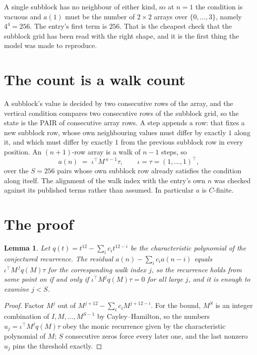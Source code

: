 \documentclass[11pt,a4paper]{article}
\theoremstyle{plain}
\newtheorem{lemma}[theorem]{Lemma}
\theoremstyle{definition}
\begin{document}
A single subblock has no neighbour of either kind, so at $n=1$ the condition is vacuous and
$a(1)$ must be the number of $2\times2$ arrays over $\{0,\dots,3\}$, namely
$4^{4}=256$. The entry's first term is $256$.
That is the cheapest check that the subblock grid has been read with the right shape, and it
is the first thing the model was made to reproduce.

\section{The count is a walk count}

A subblock's value is decided by two consecutive rows of the array, and the
vertical condition compares two consecutive rows of the subblock grid, so the state is the
PAIR of consecutive array rows. A step appends a row: that fixes a new subblock row, whose own
neighbouring values must differ by exactly $1$ along it, and which must differ by exactly
$1$ from the previous subblock row in every position. An $(n+1)$-row array is a walk of
$n-1$ steps, so
\[
a(n)\;=\;\iota^{\!\top}M^{\,n-1}\tau,\qquad\iota=\tau=(1,\dots,1)^{\!\top},
\]
over the $S=256$ pairs whose own subblock row already satisfies the condition along itself.
The alignment of the walk index with the entry's own $n$ was checked against its published
terms rather than assumed. In particular $a$ is $C$-finite.

\section{The proof}

\begin{lemma}\label{lem:crit}
Let $q(t)=t^{12}-\sum_i c_it^{12-i}$ be the characteristic polynomial of the
conjectured recurrence. The residual $a(n)-\sum_ic_ia(n-i)$ equals
$\iota^{\!\top}M^{\,j}q(M)\tau$ for the corresponding walk index $j$, so the recurrence
holds from some point on if and only if $\iota^{\!\top}M^{j}q(M)\tau=0$ for all large $j$,
and it is enough to examine $j<S$.
\end{lemma}

\begin{proof}
Factor $M^{j}$ out of $M^{j+12}-\sum_ic_iM^{j+12-i}$. For the bound, $M^{S}$
is an integer combination of $I,M,\dots,M^{S-1}$ by Cayley--Hamilton, so the numbers
$u_j=\iota^{\!\top}M^{j}q(M)\tau$ obey the monic recurrence given by the characteristic
polynomial of $M$; $S$ consecutive zeros force every later one, and the last nonzero $u_j$
pins the threshold exactly.
\end{proof}
\end{document}

